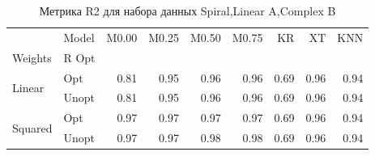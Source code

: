 \begin{table}
\caption{Метрика R2 для набора данных Spiral,Linear A,Complex B}
\label{tab:R2_Spiral,Linear A,Complex B}
\begin{tabular}{llrrrrrrr}
\toprule
 & Model & M0.00 & M0.25 & M0.50 & M0.75 & KR & XT & KNN \\
Weights & R Opt &  &  &  &  &  &  &  \\
\midrule
\multirow[t]{2}{*}{Linear} & Opt & 0.81 & 0.95 & 0.96 & 0.96 & 0.69 & 0.96 & 0.94 \\
 & Unopt & 0.81 & 0.95 & 0.96 & 0.96 & 0.69 & 0.96 & 0.94 \\

\multirow[t]{2}{*}{Squared} & Opt & 0.97 & 0.97 & 0.97 & 0.97 & 0.69 & 0.96 & 0.94 \\
 & Unopt & 0.97 & 0.97 & 0.98 & 0.98 & 0.69 & 0.96 & 0.94 \\

\bottomrule
\end{tabular}
\end{table}
